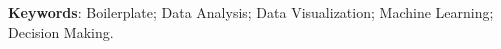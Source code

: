 \vspace{1.5ex}

{\bf Keywords}:
Boilerplate;
Data Analysis;
Data Visualization;
Machine Learning;
Decision Making.

